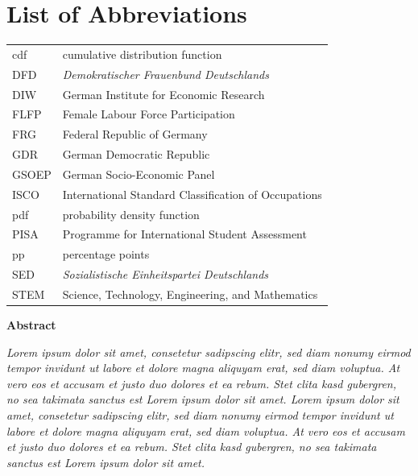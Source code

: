 \documentclass[a4paper, oneside, hyperfootnotes = false]{article}
\begin{document}
{{
{}
\section*{List of Abbreviations}
\noindent\begin{tabular}{@{}ll}
	cdf & cumulative distribution function \\
	DFD & \emph{Demokratischer Frauenbund Deutschlands} \\
    DIW & German Institute for Economic Research \\
    FLFP & Female Labour Force Participation \\
    FRG & Federal Republic of Germany \\
    GDR & German Democratic Republic \\
    GSOEP & German Socio-Economic Panel \\
    ISCO & International Standard Classification of Occupations \\
    pdf & probability density function \\
    PISA & Programme for International Student Assessment \\
    pp & percentage points \\
    SED & \emph{Sozialistische Einheitspartei Deutschlands} \\
    STEM & Science, Technology, Engineering, and Mathematics
\end{tabular}

\newpage

\begin{center}
{\large\bfseries Abstract}

\vspace{5mm}

\parbox{400pt}{
    \emph{\noindent Lorem ipsum dolor sit amet, consetetur sadipscing elitr, sed diam nonumy eirmod tempor invidunt ut labore et dolore magna aliquyam erat, sed diam voluptua. At vero eos et accusam et justo duo dolores et ea rebum. Stet clita kasd gubergren, no sea takimata sanctus est Lorem ipsum dolor sit amet. Lorem ipsum dolor sit amet, consetetur sadipscing elitr, sed diam nonumy eirmod tempor invidunt ut labore et dolore magna aliquyam erat, sed diam voluptua. At vero eos et accusam et justo duo dolores et ea rebum. Stet clita kasd gubergren, no sea takimata sanctus est Lorem ipsum dolor sit amet.
    }
}

\end{center}

}%

}
\end{document}
